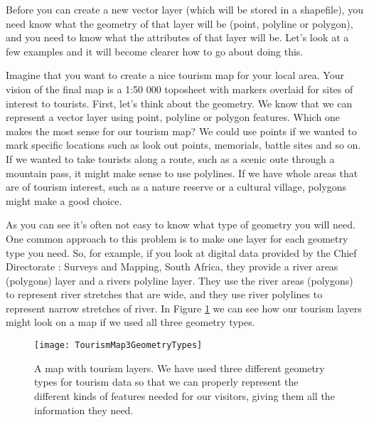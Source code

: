 Before you can create a new vector layer (which will be stored in a
shapefile), you need know what the geometry of that layer will be (point,
polyline or polygon), and you need to know what the attributes of that layer
will be. Let's look at a few examples and it will become clearer how to go
about doing this.


Imagine that you want to create a nice tourism map for your local area. Your
vision of the final map is a 1:50 000 toposheet with markers overlaid for
sites of interest to tourists. First, let's think about the geometry. We know
that we can represent a vector layer using point, polyline or polygon
features. Which one makes the most sense for our tourism map? We could use
points if we wanted to mark specific locations such as look out points,
memorials, battle sites and so on. If we wanted to take tourists along a
route, such as a scenic oute through a mountain pass, it might make sense to
use polylines. If we have whole areas that are of tourism interest, such as a
nature reserve or a cultural village, polygons might make a good choice.

As you can see it's often not easy to know what type of geometry you will
need. One common approach to this problem is to make one layer for each
geometry type you need. So, for example, if you look at digital data provided
by the Chief Directorate : Surveys and Mapping, South Africa, they provide a
river areas (polygons) layer and a rivers polyline layer. They use the river
areas (polygons) to represent river stretches that are wide, and they use
river polylines to represent narrow stretches of river. In Figure
\ref{fig:tourism} we can see how our tourism layers might look on a map if we
used all three geometry types.

\begin{figure}[ht]
   \begin{center}
   \caption{A map with tourism layers. We have used three different geometry
types for tourism data so that we can properly represent the different kinds
of features needed for our visitors, giving them all the information they
need.}
\label{fig:tourism}\smallskip
   \texttt{[image: TourismMap3GeometryTypes]}
\end{center}
\end{figure}


